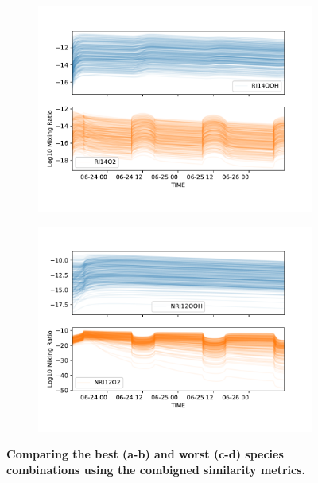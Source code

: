 \begin{figure}[H]
\begin{subfigure}[t]{.5\textwidth}
  \centering
  \includegraphics[width=\textwidth]{ensemble/RI14OOH-RI14O2.pdf}
\end{subfigure}%
\begin{subfigure}[t]{.5\textwidth}
  \centering
  \includegraphics[width=\textwidth]{ensemble/NRI12OOH-NRI12O2.pdf}
\end{subfigure}%
\caption{\textbf{Comparing the best (a-b) and worst (c-d) species combinations using the combigned similarity metrics.} }
\label{fig:lumppair}
\end{figure}






